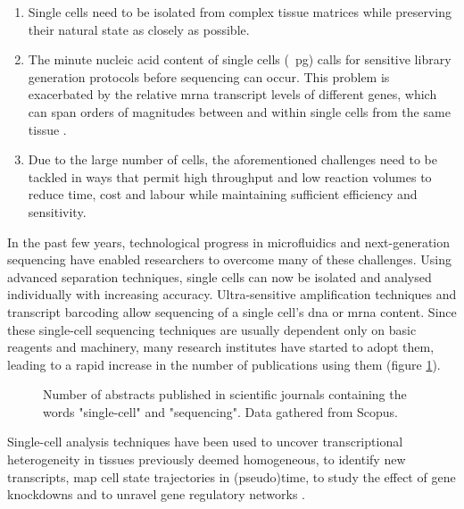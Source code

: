 \begin{enumerate}
	\setlength{\itemsep}{0pt}%
	\setlength{\parskip}{0pt}%
	\item Single cells need to be isolated from complex tissue matrices while preserving their natural state as closely as possible.
	\item The minute nucleic acid content of single cells (\SI{}{\pico\gram}) calls for sensitive library generation protocols before sequencing can occur. This problem is exacerbated by the relative \acrshort{mrna} transcript levels of different genes, which can span orders of magnitudes between and within single cells from the same tissue \citep{bengtsson2005}.
	\item Due to the large number of cells, the aforementioned challenges need to be tackled in ways that permit high throughput and low reaction volumes to reduce time, cost and labour while maintaining sufficient efficiency and sensitivity.
\end{enumerate}

In the past few years, technological progress in microfluidics and next-generation sequencing have enabled researchers to overcome many of these challenges. Using advanced separation techniques, single cells can now be isolated and analysed individually with increasing accuracy. Ultra-sensitive amplification techniques and transcript barcoding allow sequencing of a single cell's \acrshort{dna} or \acrshort{mrna} content. Since these single-cell sequencing techniques are usually dependent only on basic reagents and machinery, many research institutes have started to adopt them, leading to a rapid increase in the number of publications using them (figure \ref{fig:evolution}).

\begin{figure}[ht]
	\centerfloat
	\def\svgwidth{14cm}
	
	\caption[Number of publications in single-cell omics]{Number of abstracts published in scientific journals containing the words "single-cell" and "sequencing". Data gathered from Scopus.}
	\label{fig:evolution}
\end{figure}


Single-cell analysis techniques have been used to uncover transcriptional heterogeneity in tissues previously deemed homogeneous, to identify new transcripts, map cell state trajectories in (pseudo)time, to study the effect of gene knockdowns and to unravel gene regulatory networks \citep{tang2011}.\pms


